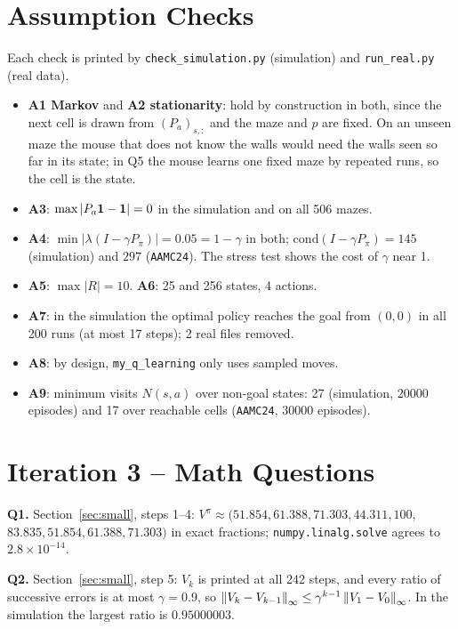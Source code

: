 \section{Assumption Checks}

Each check is printed by \texttt{check\_simulation.py} (simulation) and \texttt{run\_real.py} (real data).
\begin{itemize}[nosep]
\item \textbf{A1 Markov} and \textbf{A2 stationarity}: hold by construction in both, since the next cell is drawn from $(P_a)_{s,:}$ and the maze and $p$ are fixed. On an unseen maze the mouse that does not know the walls would need the walls seen so far in its state; in Q5 the mouse learns one fixed maze by repeated runs, so the cell is the state.
\item \textbf{A3}: $\max|P_a\mathbf{1}-\mathbf{1}| = 0$ in the simulation and on all 506 mazes.
\item \textbf{A4}: $\min|\lambda(I-\gamma P_\pi)| = 0.05 = 1-\gamma$ in both; $\mathrm{cond}(I-\gamma P_\pi) = 145$ (simulation) and $297$ (\texttt{AAMC24}). The stress test shows the cost of $\gamma$ near 1.
\item \textbf{A5}: $\max|R| = 10$. \textbf{A6}: 25 and 256 states, 4 actions.
\item \textbf{A7}: in the simulation the optimal policy reaches the goal from $(0,0)$ in all 200 runs (at most 17 steps); 2 real files removed.
\item \textbf{A8}: by design, \texttt{my\_q\_learning} only uses sampled moves.
\item \textbf{A9}: minimum visits $N(s,a)$ over non-goal states: 27 (simulation, 20000 episodes) and 17 over reachable cells (\texttt{AAMC24}, 30000 episodes).
\end{itemize}

\section{Iteration 3 -- Math Questions}

\noindent\textbf{Q1.} Section~\ref{sec:small}, steps 1--4: $V^\pi\approx(51.854, 61.388, 71.303, 44.311, 100,$ $83.835, 51.854, 61.388, 71.303)$ in exact fractions; \texttt{numpy.linalg.solve} agrees to $2.8\times10^{-14}$.
\signoff{\DS}{\GK}

\noindent\textbf{Q2.} Section~\ref{sec:small}, step 5: $V_k$ is printed at all 242 steps, and every ratio of successive errors is at most $\gamma = 0.9$, so $\left\lVert V_k-V_{k-1}\right\rVert_\infty\le\gamma^{k-1}\left\lVert V_1-V_0\right\rVert_\infty$. In the simulation the largest ratio is $0.95000003$.
\signoff{\GK}{\DS}

